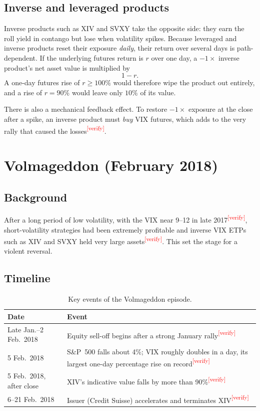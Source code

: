 \documentclass[11pt,a4paper]{article}
\newcommand{\verify}[1][]{\textcolor{red}{\textsuperscript{[verify#1]}}}
\begin{document}
\subsection{Inverse and leveraged products}

Inverse products such as XIV and SVXY take the opposite side: they earn the roll yield in contango but lose when volatility spikes. Because leveraged and inverse products reset their exposure \emph{daily}, their return over several days is path-dependent. If the underlying futures return is $r$ over one day, a $-1\times$ inverse product's net asset value is multiplied by
\begin{equation}
  1 - r .
  \label{eq:inverse}
\end{equation}
A one-day futures rise of $r\geq 100\%$ would therefore wipe the product out entirely, and a rise of $r=90\%$ would leave only $10\%$ of its value.

There is also a mechanical feedback effect. To restore $-1\times$ exposure at the close after a spike, an inverse product must \emph{buy} VIX futures, which adds to the very rally that caused the losses\verify.

\section{Volmageddon (February 2018)}

\subsection{Background}

After a long period of low volatility, with the VIX near 9--12 in late 2017\verify, short-volatility strategies had been extremely profitable and inverse VIX ETPs such as XIV and SVXY held very large assets\verify. This set the stage for a violent reversal.

\subsection{Timeline}

\begin{table}[H]
\centering
\small
\begin{tabular}{@{}p{3.6cm}p{11cm}@{}}
\toprule
\textbf{Date} & \textbf{Event}\\
\midrule
Late Jan.--2 Feb.\ 2018 & Equity sell-off begins after a strong January rally\verify\\
5 Feb.\ 2018 & S\&P~500 falls about 4\%; VIX roughly doubles in a day, its largest one-day percentage rise on record\verify\\
5 Feb.\ 2018, after close & XIV's indicative value falls by more than 90\%\verify\\
6--21 Feb.\ 2018 & Issuer (Credit Suisse) accelerates and terminates XIV\verify\\
\bottomrule
\end{tabular}
\caption{Key events of the Volmageddon episode.}
\label{tab:timeline}
\end{table}
\end{document}

